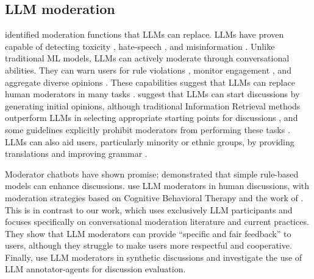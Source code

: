 \subsection{LLM moderation}

\citet{korre2025evaluation} identified moderation functions that \acp{LLM} can replace. \acp{LLM} have proven capable of detecting toxicity \cite{kang-qian-2024-implanting, Wang2022ToxicityDW}, hate-speech \cite{Nirmal2024TowardsIH, shi-2024-hatespeech}, and misinformation \cite{Liu2024DetectIJ, Xu2024ACS}. Unlike traditional \ac{ML} models, \acp{LLM} can actively moderate through conversational abilities. They can warn users for rule violations \cite{Kumar_AbuHashem_Durumeric_2024}, monitor engagement \cite{schroeder-etal-2024-fora}, and aggregate diverse opinions \cite{small-polis-llm}. These capabilities suggest that \acp{LLM} can replace human moderators in many tasks \cite{small-polis-llm, seering_self_moderation}. \citet{small-polis-llm} suggest that \acp{LLM} can start discussions by generating initial opinions, although traditional Information Retrieval methods outperform \acp{LLM} in selecting appropriate starting points for discussions \cite{karadzhov2023delidata}, and some guidelines explicitly prohibit moderators from performing these tasks \cite{dimitra-book}. \acp{LLM} can also aid users, particularly minority or ethnic groups, by providing translations and improving grammar \cite{Tsai2024Generative}. 

Moderator chatbots have shown promise; \citet{kim_et_al_chatbot} demonstrated that simple rule-based models can enhance discussions. \citet{cho-etal-2024-language} use \ac{LLM} moderators in human discussions, with moderation strategies based on Cognitive Behavioral Therapy and the work of \citet{rosenberg2015nonviolent}. This is in contrast to our work, which uses exclusively \ac{LLM} participants and focuses specifically on conversational moderation literature and current practices. They show that \ac{LLM} moderators can provide “specific and fair feedback” to users, although they struggle to make users more respectful and cooperative. Finally, \citet{dtsirmpas_thesis} use \ac{LLM} moderators in synthetic discussions and investigate the use of \ac{LLM} annotator-agents for discussion evaluation.